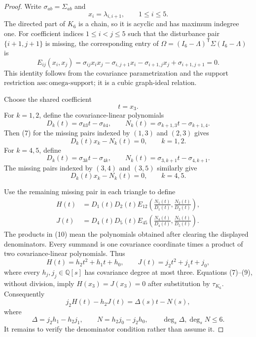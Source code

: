 \documentclass{article}
\begin{document}
\begin{proof}
Write \(\sigma_{ab}=\Sigma_{ab}\) and
\[
 x_i=\lambda_{i,i+1},\qquad 1\leq i\leq5.
\]
The directed part of \(K_6\) is a chain, so it is acyclic and has maximum indegree one.  For coefficient indices \(1\leq i<j\leq5\) such that the disturbance pair \(\{i+1,j+1\}\) is missing, the corresponding entry of
\(\Omega=(I_6-\Lambda)^{\mathsf T}\Sigma(I_6-\Lambda)\) is
\[
 E_{ij}(x_i,x_j)
 =\sigma_{ij}x_ix_j-\sigma_{i,j+1}x_i-\sigma_{i+1,j}x_j+\sigma_{i+1,j+1}=0. \tag{7}
\]
This identity follows from the covariance parametrization and the support restriction \(\mathrm{ass:omega\mbox{-}support}\); it is a cubic graph-ideal relation.

Choose the shared coefficient
\[
 t=x_3.
\]
For \(k=1,2\), define the covariance-linear polynomials
\[
 D_k(t)=\sigma_{k3}t-\sigma_{k4},\qquad
 N_k(t)=\sigma_{k+1,3}t-\sigma_{k+1,4}.
\]
Then (7) for the missing pairs indexed by \((1,3)\) and \((2,3)\) gives
\[
 D_k(t)x_k-N_k(t)=0,\qquad k=1,2. \tag{8}
\]
For \(k=4,5\), define
\[
 D_k(t)=\sigma_{3k}t-\sigma_{4k},\qquad
 N_k(t)=\sigma_{3,k+1}t-\sigma_{4,k+1}.
\]
The missing pairs indexed by \((3,4)\) and \((3,5)\) similarly give
\[
 D_k(t)x_k-N_k(t)=0,\qquad k=4,5. \tag{9}
\]

Use the remaining missing pair in each triangle to define
\[
 \begin{aligned}
 H(t)&=D_1(t)D_2(t)E_{12}\!\left(\frac{N_1(t)}{D_1(t)},\frac{N_2(t)}{D_2(t)}\right),\\
 J(t)&=D_4(t)D_5(t)E_{45}\!\left(\frac{N_4(t)}{D_4(t)},\frac{N_5(t)}{D_5(t)}\right).
 \end{aligned} \tag{10}
\]
The products in (10) mean the polynomials obtained after clearing the displayed denominators.  Every summand is one covariance coordinate times a product of two covariance-linear polynomials.  Thus
\[
 H(t)=h_2t^2+h_1t+h_0,\qquad
 J(t)=j_2t^2+j_1t+j_0, \tag{11}
\]
where every \(h_j,j_j\in\mathbb Q[s]\) has covariance degree at most three.  Equations (7)--(9), without division, imply \(H(x_3)=J(x_3)=0\) after substitution by \(\tau_{K_6}\).  Consequently
\[
 j_2H(t)-h_2J(t)
 =\Delta(s)t-N(s), \tag{12}
\]
where
\[
 \Delta=j_2h_1-h_2j_1,\qquad
 N=h_2j_0-j_2h_0,\qquad
 \deg_s\Delta,\deg_sN\leq6. \tag{13}
\]
It remains to verify the denominator condition rather than assume it.


\end{proof}
\end{document}
